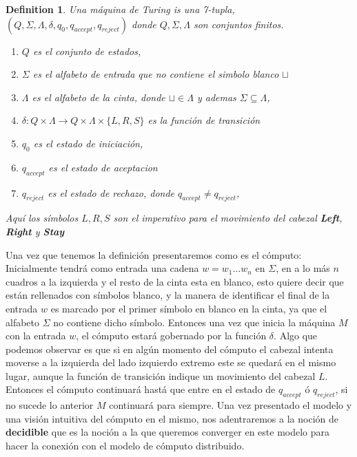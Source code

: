 \documentclass[10pt]{report}
\newtheorem{definition}{Definition}
\begin{document}
{    \begin{definition}%
        Una máquina de Turing is una 7-tupla, $(Q,\Sigma,\Lambda,\delta,q_{0},q_{accept},q_{reject})$
        donde $Q,\Sigma,\Lambda$ son conjuntos finitos.
        \begin{enumerate}
            \item $Q$ es el conjunto de estados,
            \item $\Sigma$ es el alfabeto de entrada que no contiene el simbolo blanco $\sqcup$
            \item $\Lambda$ es el alfabeto de la cinta, donde  $\sqcup\in\Lambda$ y ademas $\Sigma\subseteq\Lambda$,
            \item $\delta: Q\times\Lambda \rightarrow Q\times\Lambda\times\{L,R,S\}$ es la función de transición
            \item $q_{0}$ es el estado de iniciación,
            \item $q_{accept}$ es el estado de aceptacion
            \item $q_{reject}$ es el estado de rechazo, donde $q_{accept} \neq q_{reject}$,

        \end{enumerate}
        Aquí los símbolos $L,R,S$ son el imperativo para el movimiento del cabezal \textbf{Left}, \textbf{Right} y \textbf{Stay}
    \end{definition}
    Una vez que tenemos la definición presentaremos como es el cómputo:\newline
    Inicialmente tendrá como entrada una cadena $w = w_{1}\dots w_{n}$ en $\Sigma$, en a lo más $n$ cuadros
    a la izquierda y el resto de la cinta esta en blanco, esto quiere decir que están rellenados con símbolos blanco,
    y la manera de identificar el final de la entrada $w$ es marcado por el primer símbolo en blanco en la cinta,
    ya que el alfabeto $\Sigma$ no contiene dicho símbolo.
    Entonces una vez que inicia la máquina $M$ con la entrada $w$, el cómputo estará gobernado por la función $\delta$.
    Algo que podemos observar es que si en algún momento del cómputo el cabezal intenta moverse a la izquierda del lado
    izquierdo extremo este se quedará en el mismo lugar, aunque la función de transición indique un movimiento del cabezal $L$.
    Entonces el cómputo continuará hastá que entre en el estado de $q_{accept}$ ó $q_{reject}$,
    si no sucede lo anterior $M$ continuará para siempre.
    \newline
    Una vez presentado el modelo y una visión intuitiva del cómputo en el mismo, nos adentraremos a la noción de
    \textbf{decidible} que es la noción a la que queremos converger en este modelo para hacer la conexión con el modelo
    de cómputo distribuido.



}
\end{document}
